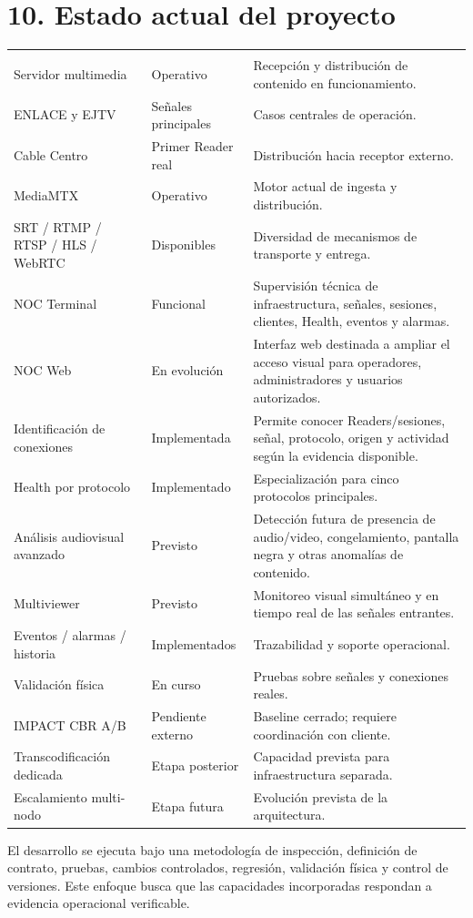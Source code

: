 \section{10. Estado actual del proyecto}
\small
\begin{longtable}{|L{0.30\textwidth}|L{0.20\textwidth}|L{0.43\textwidth}|}\hline
{} &  &  \\ \hline\endfirsthead
{} &  &  \\ \hline\endhead
Servidor multimedia & Operativo & Recepción y distribución de contenido en funcionamiento. \\ \hline
ENLACE y EJTV & Señales principales & Casos centrales de operación. \\ \hline
Cable Centro & Primer Reader real & Distribución hacia receptor externo. \\ \hline
MediaMTX & Operativo & Motor actual de ingesta y distribución. \\ \hline
SRT / RTMP / RTSP / HLS / WebRTC & Disponibles & Diversidad de mecanismos de transporte y entrega. \\ \hline
NOC Terminal & Funcional & Supervisión técnica de infraestructura, señales, sesiones, clientes, Health, eventos y alarmas. \\ \hline
NOC Web & En evolución & Interfaz web destinada a ampliar el acceso visual para operadores, administradores y usuarios autorizados. \\ \hline
Identificación de conexiones & Implementada & Permite conocer Readers/sesiones, señal, protocolo, origen y actividad según la evidencia disponible. \\ \hline
Health por protocolo & Implementado & Especialización para cinco protocolos principales. \\ \hline
Análisis audiovisual avanzado & Previsto & Detección futura de presencia de audio/video, congelamiento, pantalla negra y otras anomalías de contenido. \\ \hline
Multiviewer & Previsto & Monitoreo visual simultáneo y en tiempo real de las señales entrantes. \\ \hline
Eventos / alarmas / historia & Implementados & Trazabilidad y soporte operacional. \\ \hline
Validación física & En curso & Pruebas sobre señales y conexiones reales. \\ \hline
IMPACT CBR A/B & Pendiente externo & Baseline cerrado; requiere coordinación con cliente. \\ \hline
Transcodificación dedicada & Etapa posterior & Capacidad prevista para infraestructura separada. \\ \hline
Escalamiento multi-nodo & Etapa futura & Evolución prevista de la arquitectura. \\ \hline
\end{longtable}
\normalsize
El desarrollo se ejecuta bajo una metodología de inspección, definición de contrato, pruebas, cambios controlados, regresión, validación física y control de versiones. Este enfoque busca que las capacidades incorporadas respondan a evidencia operacional verificable.
